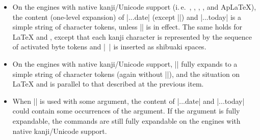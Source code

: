 \documentclass[a4paper]{article}
\newcommand{\Ie}{i.\,e.}
\newcommand*{\+}{\hspace{0.25em minus 0.25em}}
\begin{document}
\begin{itemize}
\item On the engines with native kanji/Unicode support
  (\Ie~{\LuaLaTeX}, {\XeLaTeX}, {\pLaTeX}, {\upLaTeX}, and {Ap\LaTeX}),
  the content (one-level expansion) of |\wareki...date|
  (except |\warekicustomdate|) and |\wareki...today|
  is a simple string of character tokens,
  unless |\WarekiUseCustomInterGlue| is in effect.
  The same holds for {\LaTeX} and {\pdfLaTeX},
  except that each kanji character is
  represented by the sequence of activated byte tokens
  and |~| is inserted as shibuaki spaces.
\item On the engines with native kanji/Unicode support,
  |\warekicustomdate| fully expands to a simple string
  of character tokens
  (again without |\WarekiUseCustomInterGlue|),
  and the situation on {\LaTeX} and {\pdfLaTeX}
  is parallel to that described at the previous item.
\item When |\WarekiUseCustomInterGlue| is used with some argument,
  the content of |\wareki...date| and |\wareki...today|
  could contain some occurrences of the argument.
  If the argument is fully expandable,
  the commands are still fully expandable
  on the engines with native kanji/Unicode support.
\end{itemize}

\end{document}
